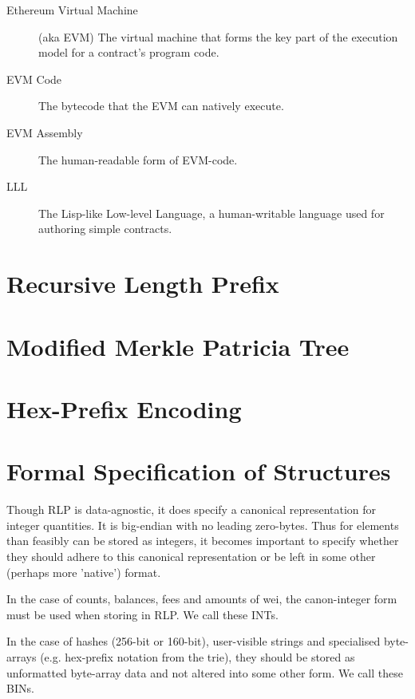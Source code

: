\documentclass[9pt,oneside]{amsart}
\begin{document}
\begin{multicols}{2}
\begin{description}
\item[Ethereum Virtual Machine] (aka EVM) The virtual machine that forms the key part of the execution model for a contract's program code.

\item[EVM Code] The bytecode that the EVM can natively execute.

\item[EVM Assembly] The human-readable form of EVM-code.

\item[LLL] The Lisp-like Low-level Language, a human-writable language used for authoring simple contracts.

\end{description}

\section{Recursive Length Prefix}\label{app:rlp}

\section{Modified Merkle Patricia Tree}\label{app:trie}

\section{Hex-Prefix Encoding}\label{app:hexprefix}

\section{Formal Specification of Structures}

Though RLP is data-agnostic, it does specify a canonical representation for integer quantities. It is big-endian with no leading zero-bytes. Thus for elements than feasibly can be stored as integers, it becomes important to specify whether they should adhere to this canonical representation or be left in some other (perhaps more 'native') format.

In the case of counts, balances, fees and amounts of wei, the canon-integer form must be used when storing in RLP. We call these INTs.

In the case of hashes (256-bit or 160-bit), user-visible strings and specialised byte-arrays (e.g. hex-prefix notation from the trie), they should be stored as unformatted byte-array data and not altered into some other form. We call these BINs.


\end{multicols}
\end{document}
